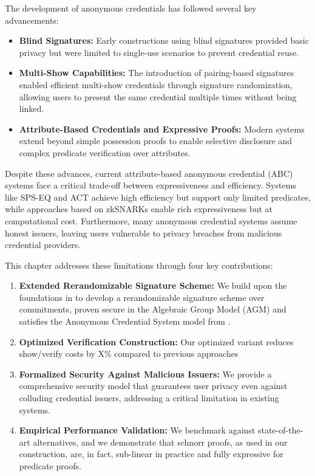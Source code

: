 The development of anonymous credentials has followed several key advancements:
\begin{itemize}
    \item \textbf{Blind Signatures:} Early constructions using blind signatures provided basic privacy but were limited to single-use scenarios to prevent credential reuse.
    
    \item \textbf{Multi-Show Capabilities:} The introduction of pairing-based signatures \cite{cimato_signature_2003, hutchison_constant-size_2006} enabled efficient multi-show credentials through signature randomization, allowing users to present the same credential multiple times without being linked.
    
    \item \textbf{Attribute-Based Credentials and Expressive Proofs:} Modern systems extend beyond simple possession proofs to enable selective disclosure and complex predicate verification over attributes.
\end{itemize}

Despite these advances, current attribute-based anonymous credential (ABC) systems face a critical trade-off between expressiveness and efficiency. Systems like SPS-EQ \cite{fuchsbauer_structure-preserving_2019, hanaoka_improved_2022} and ACT \cite{guo_anonymous_2023} achieve high efficiency but support only limited predicates, while approaches based on zkSNARKs enable rich expressiveness \cite{rosenberg_zk-creds_2022} but at computational cost. Furthermore, many anonymous credential systems assume honest issuers, leaving users vulnerable to privacy breaches from malicious credential providers.

This chapter addresses these limitations through four key contributions:
\begin{enumerate}
    \item \textbf{Extended Rerandomizable Signature Scheme:} We build upon the foundations in \cite{tomescu2022utt} to develop a rerandomizable signature scheme over commitments, proven secure in the Algebraic Group Model (AGM) and satisfies the Anonymous Credential System model from \cite{fuchsbauer_structure-preserving_2019}.
    
    \item \textbf{Optimized Verification Construction:} Our optimized variant reduces show/verify costs by X\% compared to previous approaches
    
    \item \textbf{Formalized Security Against Malicious Issuers:} We provide a comprehensive security model that guarantees user privacy even against colluding credential issuers, addressing a critical limitation in existing systems.
    
    \item \textbf{Empirical Performance Validation:} We benchmark against state-of-the-art alternatives, and we demonstrate that schnorr proofs, as used in our construction, are, in fact, sub-linear in practice and fully expressive for predicate proofs.
\end{enumerate}

